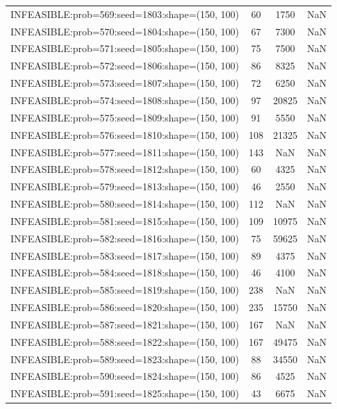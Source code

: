 \begin{longtable}{lccc}
INFEASIBLE:prob=569:seed=1803:shape=(150, 100) &    60 &  1750 &    NaN \\
INFEASIBLE:prob=570:seed=1804:shape=(150, 100) &    67 &  7300 &    NaN \\
INFEASIBLE:prob=571:seed=1805:shape=(150, 100) &    75 &  7500 &    NaN \\
INFEASIBLE:prob=572:seed=1806:shape=(150, 100) &    86 &  8325 &    NaN \\
INFEASIBLE:prob=573:seed=1807:shape=(150, 100) &    72 &  6250 &    NaN \\
INFEASIBLE:prob=574:seed=1808:shape=(150, 100) &    97 & 20825 &    NaN \\
INFEASIBLE:prob=575:seed=1809:shape=(150, 100) &    91 &  5550 &    NaN \\
INFEASIBLE:prob=576:seed=1810:shape=(150, 100) &   108 & 21325 &    NaN \\
INFEASIBLE:prob=577:seed=1811:shape=(150, 100) &   143 &   NaN &    NaN \\
INFEASIBLE:prob=578:seed=1812:shape=(150, 100) &    60 &  4325 &    NaN \\
INFEASIBLE:prob=579:seed=1813:shape=(150, 100) &    46 &  2550 &    NaN \\
INFEASIBLE:prob=580:seed=1814:shape=(150, 100) &   112 &   NaN &    NaN \\
INFEASIBLE:prob=581:seed=1815:shape=(150, 100) &   109 & 10975 &    NaN \\
INFEASIBLE:prob=582:seed=1816:shape=(150, 100) &    75 & 59625 &    NaN \\
INFEASIBLE:prob=583:seed=1817:shape=(150, 100) &    89 &  4375 &    NaN \\
INFEASIBLE:prob=584:seed=1818:shape=(150, 100) &    46 &  4100 &    NaN \\
INFEASIBLE:prob=585:seed=1819:shape=(150, 100) &   238 &   NaN &    NaN \\
INFEASIBLE:prob=586:seed=1820:shape=(150, 100) &   235 & 15750 &    NaN \\
INFEASIBLE:prob=587:seed=1821:shape=(150, 100) &   167 &   NaN &    NaN \\
INFEASIBLE:prob=588:seed=1822:shape=(150, 100) &   167 & 49475 &    NaN \\
INFEASIBLE:prob=589:seed=1823:shape=(150, 100) &    88 & 34550 &    NaN \\
INFEASIBLE:prob=590:seed=1824:shape=(150, 100) &    86 &  4525 &    NaN \\
INFEASIBLE:prob=591:seed=1825:shape=(150, 100) &    43 &  6675 &    NaN \\

\end{longtable}
